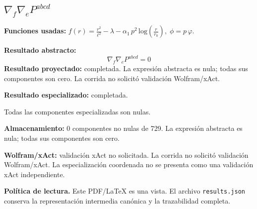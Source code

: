 \documentclass[11pt]{article}
\begin{document}
\subsection*{$ \nabla_f\nabla_e P^{abcd} $}
\textbf{Funciones usadas:} $ f\!\left(r\right) = \frac{{r}^{2}}{{\ell}^{2}} - \lambda - \alpha_{1}\,{p}^{2}\,\mathrm{log}\!\left(\frac{r}{r_{0}}\right),\;\phi=p\,\varphi $.\par
\textbf{Resultado abstracto:}
\begin{dmath*}[breakdepth={5}]
\nabla_f\nabla_e P^{abcd} = 0
\end{dmath*}
\textbf{Resultado proyectado:} completada. La expresión abstracta es nula; todas sus componentes son cero. La corrida no solicitó validación Wolfram/xAct.\par
\textbf{Resultado especializado:} completada.\par
Todas las componentes especializadas son nulas.\par
\textbf{Almacenamiento:} 0 componentes no nulas de 729. La expresión abstracta es nula; todas sus componentes son cero.\par
\textbf{Wolfram/xAct:} validación xAct no solicitada. La corrida no solicitó validación Wolfram/xAct. La especialización coordenada no se presenta como una validación xAct independiente.\par\medskip
\bigskip\noindent\textbf{Política de lectura.} Este PDF/LaTeX es una vista. El archivo \texttt{results.json} conserva la representación intermedia canónica y la trazabilidad completa.
\end{document}
